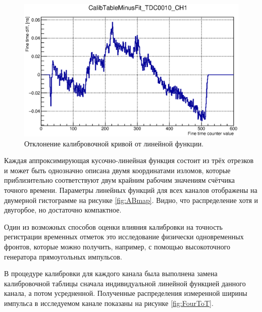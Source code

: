 \begin{figure}
\includegraphics[width=1.0\textwidth]{pictures/CalTableMinusFit_0010_01.eps}
\caption{Отклонение калибровочной кривой от линейной функции.}
\label{fig:CalibTableMinusFit}
\end{figure}

Каждая аппроксимирующая кусочно-линейная функция состоит из трёх отрезков и может быть однозначно описана двумя координатами изломов, которые приблизительно соответствуют двум крайним рабочим значениям счётчика точного времени. Параметры линейных функций для всех каналов отображены на двумерной гистограмме на рисунке \ref{fig:ABmap}.
Видно, что распределение хотя и двугорбое, но достаточно компактное.

Один из возможных способов оценки влияния калибровки на точность регистрации временных отметок это исследование физически одновременных фронтов, которые можно получить, например, с помощью высокоточного генератора прямоугольных импульсов.


В процедуре калибровки для каждого канала была выполнена замена калибровочной таблицы сначала индивидуальной линейной функцией данного канала, а потом усредненной. Полученные распределения измеренной ширины импульса в исследуемом канале показаны на рисунке \ref{fig:FourToT}.

